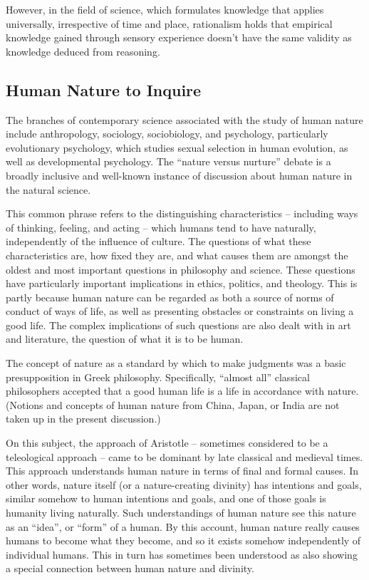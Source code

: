 However, in the field of science, which formulates knowledge that applies universally, irrespective of time and place, rationalism holds that empirical knowledge gained through sensory experience doesn’t have the same validity as knowledge deduced from reasoning.
    
\subsection{Human Nature to Inquire}

The branches of contemporary science associated with the study of human nature include anthropology, sociology, sociobiology, and psychology, particularly evolutionary psychology, which studies sexual selection in human evolution, as well as developmental psychology. The ``nature versus nurture'' debate is a broadly inclusive and well-known instance of discussion about human nature in the natural science.

This common phrase refers to the distinguishing characteristics – including ways of thinking, feeling, and acting – which humans tend to have naturally, independently of the influence of culture. The questions of what these characteristics are, how fixed they are, and what causes them are amongst the oldest and most important questions in philosophy and science. These questions have particularly important implications in ethics, politics, and theology. This is partly because human nature can be regarded as both a source of norms of conduct of ways of life, as well as presenting obstacles or constraints on living a good life. The complex implications of such questions are also dealt with in art and literature, the question of what it is to be human.

The concept of nature as a standard by which to make judgments was a basic presupposition in Greek philosophy. Specifically, ``almost all'' classical philosophers accepted that a good human life is a life in accordance with nature. (Notions and concepts of human nature from China, Japan, or India are not taken up in the present discussion.)

On this subject, the approach of Aristotle – sometimes considered to be a teleological approach – came to be dominant by late classical and medieval times. This approach understands human nature in terms of final and formal causes. In other words, nature itself (or a nature-creating divinity) has intentions and goals, similar somehow to human intentions and goals, and one of those goals is humanity living naturally. Such understandings of human nature see this nature as an ``idea'', or ``form'' of a human. By this account, human nature really causes humans to become what they become, and so it exists somehow independently of individual humans. This in turn has sometimes been understood as also showing a special connection between human nature and divinity.

